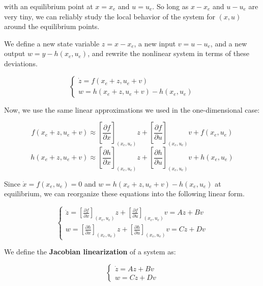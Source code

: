 \documentclass[
  letterpaper,
  DIV=11,
  numbers=noendperiod]{scrreprt}
\begin{document}
with an equilibrium point at \(x = x_e\) and \(u = u_e\). So long as
\(x - x_e\) and \(u - u_e\) are very tiny, we can reliably study the
local behavior of the system for \((x,u)\) around the equilibrium
points.

We define a new state variable \(z = x-x_e\), a new input \(v = u-u_e\),
and a new output \(w = y - h(x_e, u_e)\), and rewrite the nonlinear
system in terms of these deviations.

\begin{equation*}
    \left\{ \begin{array}{ll}
        \dot{z} = f(x_e + z, u_e + v)\\
        w = h(x_e + z, u_e + v) - h(x_e, u_e)
    \end{array} \right.
\end{equation*}

Now, we use the same linear approximations we used in the
one-dimensional case:

\[f(x_e + z, u_e + v) \approx \left[\frac{\partial f}{\partial x} \right]_{(x_e, u_e)} z + \left[\frac{\partial f}{\partial u} \right]_{(x_e, u_e)} v + f(x_e, u_e)\]
\[h(x_e + z, u_e + v) \approx \left[\frac{\partial h}{\partial x} \right]_{(x_e, u_e)} z + \left[\frac{\partial h}{\partial u} \right]_{(x_e, u_e)} v + h(x_e, u_e)\]

Since \(\dot{x} = f(x_e, u_e) = 0\) and
\(w = h(x_e + z, u_e + v) - h(x_e, u_e)\) at equilibrium, we can
reorganize these equations into the following linear form.

\begin{equation*}
    \begin{cases}
        \dot{z} = \left[\frac{\partial f}{\partial x} \right]_{(x_e, u_e)} z + \left[\frac{\partial f}{\partial u} \right]_{(x_e, u_e)} v = Az + Bv\\
        w = \left[\frac{\partial h}{\partial x} \right]_{(x_e, u_e)} z + \left[\frac{\partial h}{\partial u} \right]_{(x_e, u_e)} v = Cz + Dv
    \end{cases}
\end{equation*}

We define the \textbf{Jacobian linearization} of a system as:

\begin{equation*}
    \begin{cases}
        \dot{z} = Az + Bv \\
        w = Cz + Dv
    \end{cases}
\end{equation*}
\end{document}
